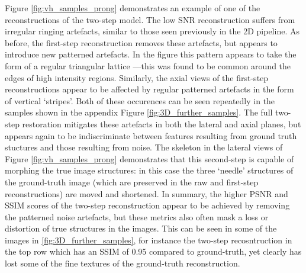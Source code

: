 \documentclass[12pt]{article}
\begin{document}
Figure \ref{fig:vh_samples_prong} demonstrates an example of one of the reconstructions of the two-step model.
The low SNR reconstruction suffers from irregular ringing artefacts, similar to those seen previously in the 2D pipeline.
As before, the first-step reconstruction removes these artefacts,
but appears to introduce new patterned artefacts.
In the figure this pattern appears to take the form of a regular triangular lattice
---this was found to be common around the edges of high intensity regions.
Similarly, the axial views of the first-step reconstructions appear to be affected by regular patterned artefacts in the form of vertical `stripes'.
Both of these occurences can be seen repeatedly in the samples shown in the appendix Figure \ref{fig:3D_further_samples}.
The full two-step restoration mitigates these artefacts in both the lateral and axial planes,
but appears again to be indiscriminate between features resulting from ground truth stuctures and those resulting from noise.
The skeleton in the lateral views of Figure \ref{fig:vh_samples_prong} demonstrates that this second-step is capable of morphing the true image structures:
in this case the three `needle' structures of the ground-truth image (which are preserved in the raw and first-step reconstructions) are moved and shortened.
In summary, the higher PSNR and SSIM scores of the two-step reconstruction appear to be achieved by removing the patterned noise artefacts,
but these metrics also often mask a loss or distortion of true structures in the images.
This can be seen in some of the images in \ref{fig:3D_further_samples},
for instance the two-step recosntruction in the top row which has an SSIM of 0.95 compared to ground-truth,
yet clearly has lost some of the fine textures of the ground-truth reconstruction.
\end{document}
